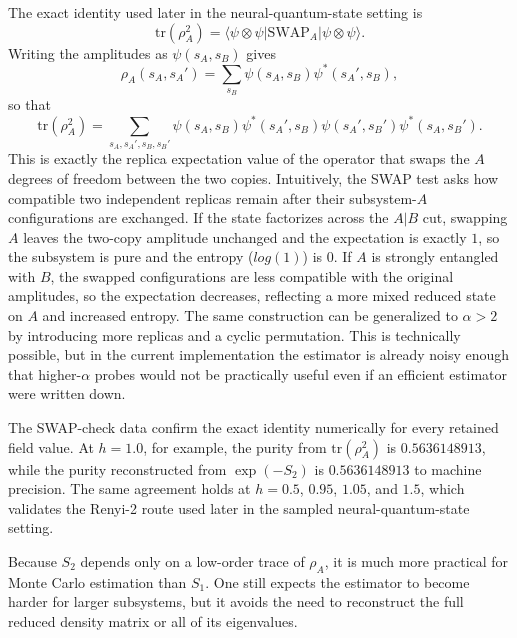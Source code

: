 \documentclass[11pt,a4paper]{article}
\begin{document}
    The exact identity used later in the neural-quantum-state setting is
    \begin{equation}
        \mathrm{tr}(\rho_A^2)
        =
        \langle \psi \otimes \psi \rvert
        \mathrm{SWAP}_A
        \lvert \psi \otimes \psi \rangle .
    \end{equation}
    Writing the amplitudes as $\psi(s_A,s_B)$ gives
    \begin{equation}
        \rho_A(s_A,s_A') = \sum_{s_B} \psi(s_A,s_B)\psi^*(s_A',s_B) ,
    \end{equation}
    so that
    \begin{equation}
        \mathrm{tr}(\rho_A^2)
        =
        \sum_{s_A,s_A',s_B,s_B'}
        \psi(s_A,s_B)\psi^*(s_A',s_B)\psi(s_A',s_B')\psi^*(s_A,s_B') .
    \end{equation}
    This is exactly the replica expectation value of the operator that swaps the $A$ degrees of freedom between the two copies. Intuitively, the SWAP test asks how compatible two independent replicas remain after their subsystem-$A$ configurations are exchanged. If the state factorizes across the $A|B$ cut, swapping $A$ leaves the two-copy amplitude unchanged and the expectation is exactly $1$, so the subsystem is pure and the entropy ($log(1)$) is 0. If $A$ is strongly entangled with $B$, the swapped configurations are less compatible with the original amplitudes, so the expectation decreases, reflecting a more mixed reduced state on $A$ and increased entropy. The same construction can be generalized to $\alpha>2$ by introducing more replicas and a cyclic permutation. This is technically possible, but in the current implementation the estimator is already noisy enough that higher-$\alpha$ probes would not be practically useful even if an efficient estimator were written down.

    The SWAP-check data confirm the exact identity numerically for every retained field value. At $h=1.0$, for example, the purity from $\mathrm{tr}(\rho_A^2)$ is $0.5636148913$, while the purity reconstructed from $\exp(-S_2)$ is $0.5636148913$ to machine precision. The same agreement holds at $h=0.5$, $0.95$, $1.05$, and $1.5$, which validates the Renyi-2 route used later in the sampled neural-quantum-state setting.

    Because $S_2$ depends only on a low-order trace of $\rho_A$, it is much more practical for Monte Carlo estimation than $S_1$. One still expects the estimator to become harder for larger subsystems, but it avoids the need to reconstruct the full reduced density matrix or all of its eigenvalues.
\end{document}
